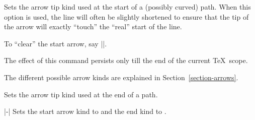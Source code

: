 \begin{command}{\pgfsetarrowsstart{}}
  Sets the arrow tip kind used at the start of a (possibly curved)
  path. When this option is used, the line will often be slightly
  shortened to ensure that the tip of the arrow will exactly ``touch''
  the ``real'' start of the line.

  To ``clear'' the start arrow, say |\pgfsetarrowsstart{}|.
\begin{codeexample}[]
\begin{pgfpicture}
  \pgfpathmoveto{\pgfpointorigin}
  \pgfpathlineto{\pgfpoint{1cm}{0cm}}
  \pgfpathmoveto{\pgfpoint{0cm}{2mm}}
  \pgfpathlineto{\pgfpoint{1cm}{2mm}}
\end{pgfpicture}
\end{codeexample}

  The effect of this command persists only till the end of the current
  \TeX\ scope.

  The different possible arrow kinds are explained in
  Section~\ref{section-arrows}.  
\end{command}

\begin{command}{\pgfsetarrowsend{}}
  Sets the arrow tip kind used at the end of a path.
\begin{codeexample}[]
\begin{pgfpicture}
  \pgfpathmoveto{\pgfpointorigin}
  \pgfpathlineto{\pgfpoint{1cm}{0cm}}
\end{pgfpicture}
\end{codeexample}
\end{command}

\begin{command}{|-|}
  Sets the start arrow kind to  and the end kind to
  .
\begin{codeexample}[]
\begin{pgfpicture}
  \pgfpathmoveto{\pgfpointorigin}
  \pgfpathlineto{\pgfpoint{1cm}{0cm}}
\end{pgfpicture}
\end{codeexample}
\end{command}

